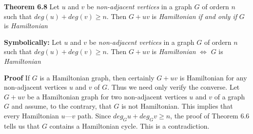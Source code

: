 \nopagenumbers
{\bf Theorem 6.8}
\vskip 6pt
Let $u$ and $v$ be {\it non-adjacent vertices} in a graph $G$ of ordern $n$ such that $deg(u)+deg(v) \geq n$. Then $G+uv$ is {\it Hamiltonian}
{\it if and only if} $G$ is {\it Hamiltonian}

\vskip 1in
{\bf Symbolically:}
\vskip 6pt
Let $u$ and $v$ be {\it non-adjacent vertices} in a graph $G$ of ordern $n$ such that $deg(u)+deg(v) \geq n$. Then $G+uv$ is {\it Hamiltonian}
$\Leftrightarrow$ $G$ is {\it Hamiltonian}

\vskip 1in
{\bf Proof}
\vskip 6pt
If $G$ is a Hamiltonian graph, then certainly $G+uv$ is Hamiltonian for any non-adjacent vertices $u$ and $v$ of $G$. Thus we need only verify the converse.
\vskip 1mm
Let $G+uv$ be a Hamiltonian graph for two non-adjacent vertices $u$ and $v$ of a graph $G$ and assume, to the contrary, that $G$ is not Hamiltonian. This
implies that every Hamiltonian $u$---$v$ path. Since $deg_Gu+deg_Gv \geq n$, the proof of Theorem 6.6 tells us that $G$ contains a Hamiltonian cycle. This is a contradiction.

\vfill\eject
